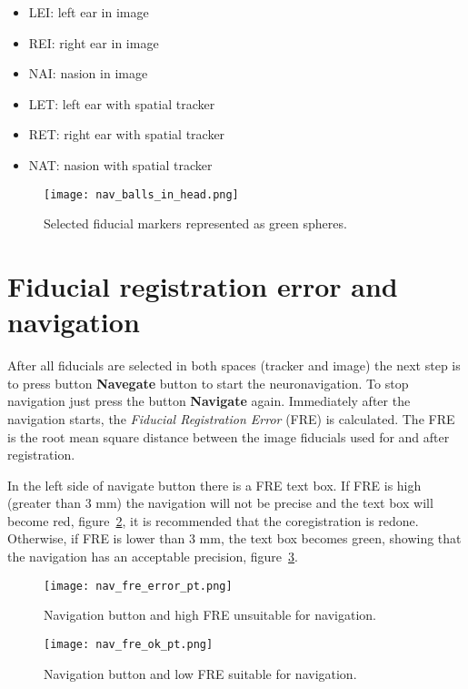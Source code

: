 \begin{itemize}
	\item LEI: left ear in image
	\item REI: right ear in image
	\item NAI: nasion in image
	\item LET: left ear with spatial tracker
	\item RET: right ear with spatial tracker
	\item NAT: nasion with spatial tracker
\end{itemize}

\begin{figure}[!htb]
\centering
\texttt{[image: nav\_balls\_in\_head.png]}
\caption{Selected fiducial markers represented as green spheres.}
\label{fig:nav_balls_in_head}
\end{figure}


\section{Fiducial registration error and navigation}

After all fiducials are selected in both spaces (tracker and image) the next step is to press button \textbf{Navegate}
button to start the neuronavigation. To stop navigation just press the button \textbf{Navigate} again.
Immediately after the navigation starts, the  \textit{Fiducial Registration Error} (FRE) is calculated. The FRE is the
root mean square distance between the image fiducials used for and after registration.

In the left side of navigate button there is a FRE text box. If FRE is high (greater than 3 mm) the navigation will not
be precise and the text box will become red, figure~\ref{fig:nav_fre_error}, it is recommended that the coregistration
is redone. Otherwise, if FRE is lower than 3 mm, the text box becomes green, showing that the navigation has an
acceptable precision, figure~\ref{fig:nav_fre_ok}.

\begin{figure}[!htb]
\centering
\texttt{[image: nav\_fre\_error\_pt.png]}
\caption{Navigation button and high FRE unsuitable for navigation.}
\label{fig:nav_fre_error}
\end{figure}

\begin{figure}[!htb]
\centering
\texttt{[image: nav\_fre\_ok\_pt.png]}
\caption{Navigation button and low FRE suitable for navigation.}
\label{fig:nav_fre_ok}
\end{figure}


